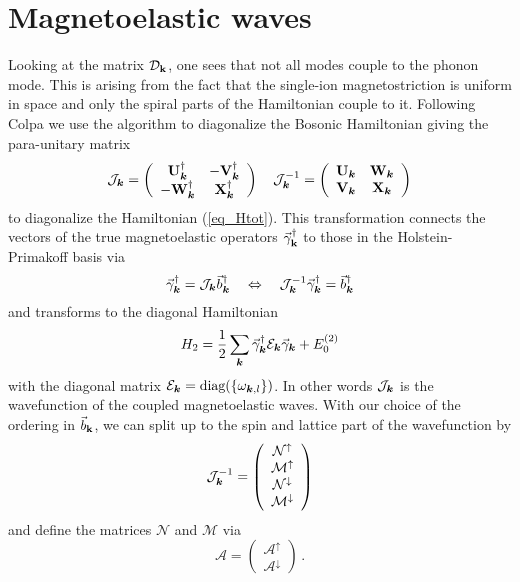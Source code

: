 \documentclass[aps,prl,twocolumn,superscriptaddress,amsmath,amssymb,floats,aps,10pt]{revtex4-1}
\begin{document}
\section{Magnetoelastic waves}
Looking at the matrix ${\mathcal D}_{\bf k}$, one sees that not all modes couple to the phonon mode. This is arising from the fact that the single-ion magnetostriction
is uniform in space and only the spiral parts of the Hamiltonian couple to it. Following Colpa \cite{Colpa78,Serga12} we use the algorithm to diagonalize
the Bosonic Hamiltonian giving the para-unitary matrix
\begin{equation}
  {\mathcal J}_{\bm k}=\left(\begin{array}{cc} {\mathbf U}_{\bm k}^\dagger&- {\mathbf V}_{\bm k}^\dagger\\
- {\mathbf W}_{\bm k}^\dagger& {\mathbf X}_{\bm k}^\dagger\end{array}\right)\quad   {\mathcal J}_{\bm k}^{-1}=\left(\begin{array}{cc} {\mathbf U}_{\bm k}& {\mathbf W}_{\bm k}\\
 {\mathbf V}_{\bm k}& {\mathbf X}_{\bm k}\end{array}\right)
\end{equation}
to diagonalize the Hamiltonian (\ref{eq_Htot}).
This transformation connects the vectors of the true magnetoelastic operators $\vec{\gamma}_{\bf k}^\dagger$ to those in the Holstein-Primakoff basis via
\begin{equation}
        \vec{\gamma}_{\bm k}^\dagger={\mathcal J}_{\bm k}  \vec b_{\bm k}^\dagger \quad \Leftrightarrow \quad  {\mathcal J}_{\bm k}^{-1}\vec{\gamma}_{\bm k}^\dagger=  \vec b_{\bm k}^\dagger
        \label{eq_genbogoliubov}
\end{equation}
and transforms to the diagonal Hamiltonian
\begin{equation}
 {H}_2=\frac 12 \sum_{\bm k}\vec \gamma_{\bm k}^\dagger{\mathcal E}_{\bm k} \vec \gamma_{\bm k}+E_0^{(2)}
\end{equation}
with the diagonal matrix ${\mathcal E}_{\bm k}=\text{diag}(\{\omega_{\bm k,l}\})$. In other words ${\mathcal J}_{\bm k}$ is the wavefunction of the coupled magnetoelastic waves.
With our choice of the ordering in $\vec b_{\bf k}$, we can split up to the spin and lattice part of the wavefunction by
\begin{equation}
 {\mathcal J}_{\bm k}^{-1}=\left(
  \begin{array}{cccc}
\mathcal N^{\uparrow}\\
\mathcal M^{\uparrow}\\
\mathcal N^{\downarrow}\\
\mathcal M^{\downarrow}
  \end{array}\right)
\end{equation}
and define the matrices $\mathcal N$ and $\mathcal M$ via
\begin{equation}
\mathcal A=\left(
   \begin{array}{cccc}
    \mathcal A^{\uparrow}\\
\mathcal A^{\downarrow}
   \end{array}\right)\,.
\end{equation}
\end{document}

